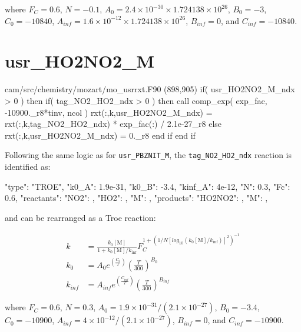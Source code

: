 \documentclass[titlepage]{article}
\begin{document}
\noindent where $F_C = 0.6$, $N = -0.1$, $A_0 = 2.4 \times 10^{-30} \times 1.724138 \times 10^{26}$, $B_0 = -3$, $C_0 = -10840$, $A_{inf} = 1.6 \times 10^{-12} \times 1.724138 \times 10^{26}$, $B_{inf} = 0$, and $C_{inf} = -10840$.


\section{usr\_HO2NO2\_M}

\begin{blockcode}[commandchars=\\\{\}]
\color{gray}cam/src/chemistry/mozart/mo_usrrxt.F90 (898,905)
       if( usr_HO2NO2_M_ndx > 0 ) then
          if( tag_NO2_HO2_ndx > 0 ) then
             call comp_exp( exp_fac, -10900._r8*tinv, ncol )
             rxt(:,k,usr_HO2NO2_M_ndx) = rxt(:,k,tag_NO2_HO2_ndx) * exp_fac(:) / 2.1e-27_r8
          else
             rxt(:,k,usr_HO2NO2_M_ndx) = 0._r8
          end if
       end if
\end{blockcode}

Following the same logic as for \verb>usr_PBZNIT_M>, the \verb>tag_NO2_HO2_ndx> reaction is identified as:

\begin{blockcode}
        {
          "type": "TROE",
          "k0_A": 1.9e-31,
          "k0_B": -3.4,
          "kinf_A": 4e-12,
          "N": 0.3,
          "Fc": 0.6,
          "reactants": {
            "NO2": { },
            "HO2": { },
            "M": { }
          },
          "products": {
            "HO2NO2": { },
            "M": { }
          }
        },
\end{blockcode}

\noindent and can be rearranged as a Troe reaction:

\begin{equation}
\begin{split}
k & = \frac{k_0[\mbox{M}]}{1+k_0[\mbox{M}]/k_{\inf}}F_C^{1+(1/N[log_{10}(k_0[\mbox{M}]/k_{\inf})]^2)^{-1}} \\
k_0 & = A_0 e^{\left( \frac{C_0}{T} \right)} \left( \frac{T}{300} \right)^{B_0} \\
k_{inf} & = A_{inf} e^{\left( \frac{C_{inf}}{T} \right)} \left( \frac{T}{300} \right)^{B_{inf}}
\end{split}
\end{equation}

\noindent where $F_C = 0.6$, $N = 0.3$, $A_0 = 1.9 \times 10^{-31} / \left( 2.1 \times 10^{-27} \right)$, $B_0 = -3.4$, $C_0 = -10900$, $A_{inf} = 4 \times 10^{-12} / \left( 2.1 \times 10^{-27} \right)$, $B_{inf} = 0$, and $C_{inf} = -10900$.
\end{document}
